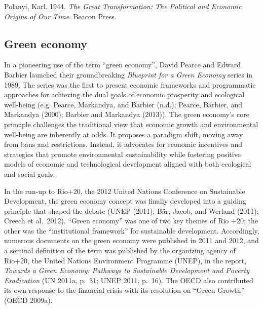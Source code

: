\documentclass[
  a4paper,
  openany]{book}
\begin{document}
\begin{tcolorbox}[enhanced jigsaw, coltitle=black, bottomtitle=1mm, opacitybacktitle=0.6, titlerule=0mm, opacityback=0, leftrule=.75mm, colbacktitle=quarto-callout-note-color!10!white, bottomrule=.15mm, toptitle=1mm, breakable, title={Further reading}, arc=.35mm, rightrule=.15mm, toprule=.15mm, left=2mm, colback=white, colframe=quarto-callout-note-color-frame]

Polanyi, Karl. 1944. \emph{The Great Transformation: The Political and
Economic Origins of Our Time}. Beacon Press.

\end{tcolorbox}

\subsection{Green economy}\label{green-economy}

In a pioneering use of the term ``green economy'', David Pearce and
Edward Barbier launched their groundbreaking \emph{Blueprint for a Green
Economy} series in 1989. The series was the first to present economic
frameworks and programmatic approaches for achieving the dual goals of
economic prosperity and ecological well-being (e.g. Pearce, Markandya,
and Barbier (n.d.); Pearce, Barbier, and Markandya (2000); Barbier and
Markandya (2013)). The green economy's core principle challenges the
traditional view that economic growth and environmental well-being are
inherently at odds. It proposes a paradigm shift, moving away from bans
and restrictions. Instead, it advocates for economic incentives and
strategies that promote environmental sustainability while fostering
positive models of economic and technological development aligned with
both ecological and social goals.

In the run-up to Rio+20, the 2012 United Nations Conference on
Sustainable Development, the green economy concept was finally developed
into a guiding principle that shaped the debate (UNEP (2011); Bär,
Jacob, and Werland (2011); Creech et al.~2012). ``Green economy'' was
one of two key themes of Rio +20; the other was the ``institutional
framework'' for sustainable development. Accordingly, numerous documents
on the green economy were published in 2011 and 2012, and a seminal
definition of the term was published by the organizing agency of Rio+20,
the United Nations Environment Programme (UNEP), in the report,
\emph{Towards a Green Economy: Pathways to Sustainable Development and
Poverty Eradication} (UN 2011a, p.~31; UNEP 2011, p.~16). The OECD also
contributed its own response to the financial crisis with its resolution
on ``Green Growth'' (OECD 2009a).
\end{document}
